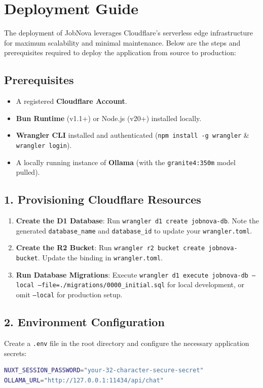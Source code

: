 \documentclass[12pt,a4paper]{report}
\begin{document}
\newpage
\section{Deployment Guide}

The deployment of JobNova leverages Cloudflare's serverless edge infrastructure for maximum scalability and minimal maintenance. Below are the steps and prerequisites required to deploy the application from source to production:

\subsection{Prerequisites}
\begin{itemize}[itemsep=0pt]
    \item A registered \textbf{Cloudflare Account}.
    \item \textbf{Bun Runtime} (v1.1+) or Node.js (v20+) installed locally.
    \item \textbf{Wrangler CLI} installed and authenticated (\texttt{npm install -g wrangler} \& \texttt{wrangler login}).
    \item A locally running instance of \textbf{Ollama} (with the \texttt{granite4:350m} model pulled).
\end{itemize}

\subsection{1. Provisioning Cloudflare Resources}
\begin{enumerate}[itemsep=0pt]
    \item \textbf{Create the D1 Database}: Run \texttt{wrangler d1 create jobnova-db}. Note the generated \texttt{database\_name} and \texttt{database\_id} to update your \texttt{wrangler.toml}.
    \item \textbf{Create the R2 Bucket}: Run \texttt{wrangler r2 bucket create jobnova-bucket}. Update the binding in \texttt{wrangler.toml}.
    \item \textbf{Run Database Migrations}: Execute \texttt{wrangler d1 execute jobnova-db --local --file=./migrations/0000\_initial.sql} for local development, or omit \texttt{--local} for production setup.
\end{enumerate}

\subsection{2. Environment Configuration}
Create a \texttt{.env} file in the root directory and configure the necessary application secrets:
\begin{lstlisting}[language=bash, caption=Sample Environment Configuration]
NUXT_SESSION_PASSWORD="your-32-character-secure-secret"
OLLAMA_URL="http://127.0.0.1:11434/api/chat"
\end{lstlisting}
\end{document}

